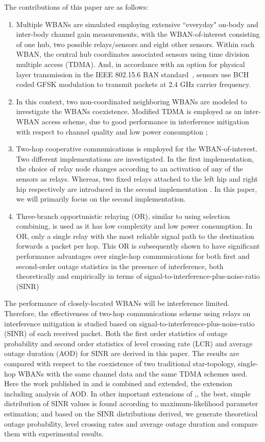 \documentclass[12pt,draftcls,a4paper,onecolumn,journal]{IEEEtran}
\begin{document}
The contributions of this paper are as follows:
\begin{enumerate}
\item
Multiple WBANs are simulated employing extensive ``everyday" on-body and inter-body channel gain measurements\cite{NICTAdata}, with the WBAN-of-interest consisting of one hub, two possible relays/sensors and eight other sensors. Within each WBAN, the central hub coordinates associated sensors using time division multiple access (TDMA). And, in accordance with an option for physical layer transmission in the IEEE 802.15.6 BAN standard~\cite{tg6_d}, sensors use BCH coded GFSK modulation to transmit packets at 2.4 GHz carrier frequency.
\item
In this context, two non-coordinated neighboring WBANs are modeled to investigate the WBANs coexistence. Modified TDMA is employed as an inter-WBAN access scheme, due to good performance in interference mitigation with respect to channel quality and low power consumption \cite{Zhang2010};
\item
Two-hop cooperative communications is employed for the WBAN-of-interest. Two different implementations are investigated. In the first implementation, the choice of relay node changes according to an activation of any of the sensors as relays\cite{Dong2012}. Whereas, two fixed relays attached to the left hip and right hip respectively are introduced in the second implementation \cite{Dong:ICC:2013}. In this paper, we will primarily focus on the second implementation.
\item
Three-branch opportunistic relaying (OR), similar to using selection combining, is used as it has low complexity and low power consumption. In OR, only a single relay with the most reliable signal path to the destination forwards a packet per hop. This OR is subsequently shown to have significant performance advantages over single-hop communications for both first and second-order outage statistics in the presence of interference, both theoretically and empirically in terms of signal-to-interference-plus-noise-ratio (SINR)
\end{enumerate}

The performance of closely-located WBANs will be interference limited. Therefore, the effectiveness of two-hop communications scheme using relays on interference mitigation is studied based on signal-to-interference-plus-noise-ratio (SINR) of each received packet. Both the first order statistics of outage probability and second order statistics of level crossing rate (LCR) and average outage duration (AOD) for SINR are derived in this paper. The results are compared with respect to the coexistence of two traditional star-topology, single-hop WBANs with the same channel data and the same TDMA schemes used. Here the work published in \cite{Dong2012} and \cite{Dong:ICC:2013} is combined and extended, the extension including analysis of AOD. In other important extensions of \cite{Dong2012},\cite{Dong:ICC:2013}, the best, simple distribution of SINR values is found according to maximum-likelihood parameter estimation; and based on the SINR distributions derived, we generate theoretical outage probability, level crossing rates and average outage duration and compare them with experimental results.
\end{document}
